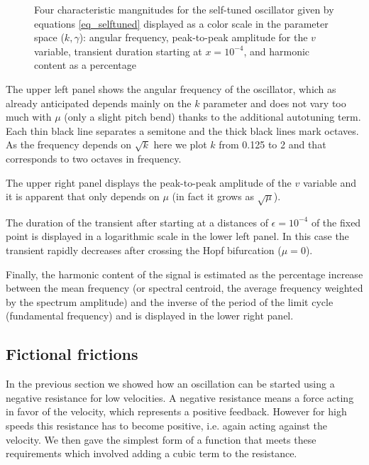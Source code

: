 \documentclass{article}
\begin{document}
\begin{figure}[h!]
    \centering
    \caption{Four characteristic mangnitudes for the self-tuned oscillator given by equations \ref{eq_selftuned} displayed as a color scale in the parameter space ($k,\gamma$): angular frequency, peak-to-peak amplitude for the $v$ variable, transient duration starting at $x=10^{-4}$, and harmonic content as a percentage} 
    \label{fig_selfcompared}
\end{figure}

The upper left panel shows the angular frequency of the oscillator, which as already anticipated depends mainly on the $k$ parameter and does not vary too much with $\mu$ (only a slight pitch bend) thanks to the additional autotuning term. 
Each thin black line separates a semitone and the thick black lines mark octaves. 
As the frequency depends on $\sqrt{k}$ here we plot $k$ from 0.125 to 2 and that corresponds to two octaves in frequency.

The upper right panel displays the peak-to-peak amplitude of the $v$ variable and it is apparent that only depends on $\mu$ (in fact it grows as $\sqrt{\mu}$). 

The duration of the transient after starting at a distances of $\epsilon = 10^{-4}$ of the fixed point is displayed in a logarithmic scale in the lower left panel. 
In this case the transient rapidly decreases after crossing the Hopf bifurcation ($\mu=0$). 

Finally, the harmonic content of the signal is estimated as the percentage increase between the mean frequency (or spectral centroid, the average frequency weighted by the spectrum amplitude) and the inverse of the period of the limit cycle (fundamental frequency) and is displayed in the lower right panel.

\subsection{Fictional frictions}

In the previous section we showed how an oscillation can be started using a negative resistance for low velocities. 
A negative resistance means a force acting in favor of the velocity, which represents a positive feedback. 
However for high speeds this resistance has to become positive, i.e. again acting against the velocity. 
We then gave the simplest form of a function that meets these requirements which involved adding a cubic term to the resistance. 
\end{document}
